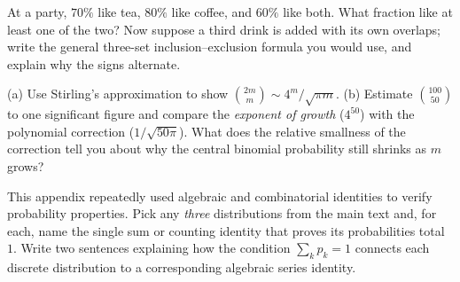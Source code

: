\begin{exercise}
At a party, $70\%$ like tea, $80\%$ like coffee, and $60\%$ like both. What
fraction like at least one of the two? Now suppose a third drink is added with
its own overlaps; write the general three-set inclusion--exclusion formula you
would use, and explain why the signs alternate.
\end{exercise}

\begin{exercise}[Stirling]
(a) Use Stirling's approximation to show $\binom{2m}{m}\sim 4^m/\sqrt{\pi m}$.
(b) Estimate $\binom{100}{50}$ to one significant figure and compare the
\emph{exponent of growth} ($4^{50}$) with the polynomial correction
($1/\sqrt{50\pi}$). What does the relative smallness of the correction tell
you about why the central binomial probability still shrinks as $m$ grows?
\end{exercise}

\begin{exercise}
This appendix repeatedly used algebraic and combinatorial identities to verify
probability properties. Pick any \emph{three} distributions from the main
text and, for each, name the single sum or counting identity that proves its
probabilities total $1$. Write two sentences explaining how the condition
$\sum_k p_k = 1$ connects each discrete distribution to a corresponding
algebraic series identity.
\end{exercise}
